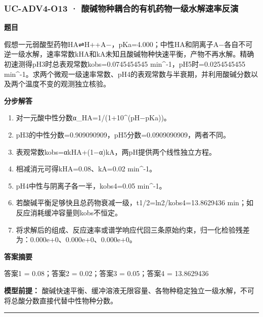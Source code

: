 \documentclass[UTF8,11pt,a4paper]{ctexart}
\begin{document}
\subsubsection*{UC-ADV4-O13 · 酸碱物种耦合的有机药物一级水解速率反演}
\noindent\textbf{题目}\par
假想一元弱酸型药物HA⇌H++A−，pKa=4.000；中性HA和阴离子A−各自不可逆一级水解，速率常数kHA和kA未知且酸碱物种快速平衡，产物不再水解。精确初速测得pH3时总表观常数kobs=0.0745454545 min\textasciicircum{}-1，pH5时=0.0254545455 min\textasciicircum{}-1。求两个微观一级速率常数、pH4的表观常数与半衰期，并利用酸碱分数以及两个温度不变的观测独立核验。\par
\medskip\noindent\textbf{分步解答}
\begin{enumerate}
\item 对一元酸中性分数α\_HA=1/(1+10\textasciicircum{}(pH−pKa))。
\item pH3的中性分数=0.909090909，pH5分数=0.0909090909，两者不同。
\item 表观常数kobs=αkHA+(1−α)kA，两pH提供两个线性独立方程。
\item 相减消元可得kHA=0.08、kA=0.02 min\textasciicircum{}-1。
\item pH4中性与阴离子各一半，kobs4=0.05 min\textasciicircum{}-1。
\item 若酸碱平衡足够快且总药物衰减一级，t1/2=ln2/kobs4=13.8629436 min；如反应消耗缓冲容量则kobs不恒定。
\item 将求解后的组成、反应速率或谱学响应代回三条原始约束，归一化检验残差为：0.000e+0、0.000e+0、0.000e+0。
\end{enumerate}
\noindent\textbf{答案摘要}\par
答案1 = 0.08；答案2 = 0.02；答案3 = 0.05；答案4 = 13.8629436\par
\noindent\textbf{模型前提：}
酸碱快速平衡、缓冲溶液无限容量、各物种稳定独立一级水解，不可将总酸分数直接代替中性物种分数。\par
\medskip\hrule\medskip
{}
\end{document}
